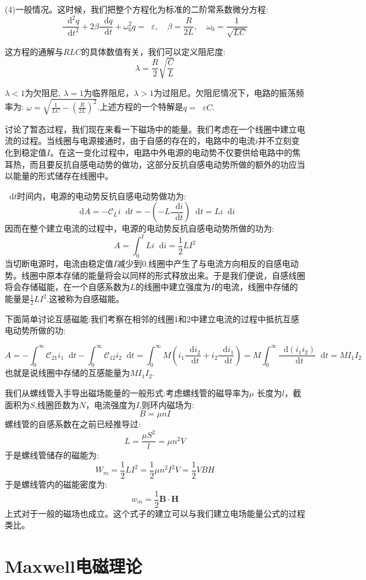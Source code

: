 \documentclass[12pt,a4paper,oneside]{report}
\theoremstyle{definition}
\theoremstyle{remark}
\renewcommand{\d}{\mathop{}\!\mathrm{d}}
\renewcommand{\v}{\mathop{}\!\varepsilon}
\begin{document}
(4)一般情况。这时候，我们把整个方程化为标准的二阶常系数微分方程:
\[
\frac{\d^2 q}{\d t^2}+2\beta \frac{\d q}{\d t}+\omega_0^2 q = \v,\quad \beta = \frac{R}{2L}, \quad \omega_0 = \frac{1}{\sqrt{LC}}
\]

这方程的通解与$RLC$的具体数值有关，我们可以定义阻尼度:
\[
\lambda = \frac{R}{2}\sqrt{\frac{C}{L}}
\]

$\lambda<1$为欠阻尼, $\lambda=1$为临界阻尼，$\lambda>1$为过阻尼。欠阻尼情况下，电路的振荡频率为:
$\omega = \sqrt{\frac{1}{LC}-(\frac{R}{2L})^2}$.上述方程的一个特解是$q=\v C$.

讨论了暂态过程，我们现在来看一下磁场中的能量。我们考虑在一个线圈中建立电流的过程。当线圈与电源接通时，由于自感的存在的，电路中的电流$i$并不立刻变化到稳定值$I$。在这一变化过程中，电路中外电源的电动势不仅要供给电路中的焦耳热，而且要反抗自感电动势的做功，这部分反抗自感电动势所做的额外的功应当以能量的形式储存在线圈中。

$\d t$时间内，电源的电动势反抗自感电动势做功为:
\[
\d A = -\mathscr C_{L} i \d t =-(-L\frac{\d i}{\d t})\d t = Li\d i
\]
因而在整个建立电流的过程中，电源的电动势反抗自感电动势所做的功为:
\[
A = \int_0^I Li\d i =\frac{1}{2}LI^2
\]
当切断电源时，电流由稳定值$I$减少到$0$.线圈中产生了与电流方向相反的自感电动势。线圈中原本存储的能量将会以同样的形式释放出来。于是我们便说，自感线圈将会存储磁能，在一个自感系数为$L$的线圈中建立强度为$I$的电流，线圈中存储的能量是$\frac{1}{2}LI^2$.这被称为自感磁能。

下面简单讨论互感磁能:我们考察在相邻的线圈$1$和$2$中建立电流的过程中抵抗互感电动势所做的功:

\[
A = -\int_0^{\infty}\mathscr C_{21}i_1\d t-\int_0^{\infty}\mathscr C_{12}i_2\d t =\int_0^{\infty} M(i_1\frac{\d i_2}{\d t}+i_2\frac{\d i_1}{\d t})=M\int_0^{\infty}\frac{\d(i_1i_2)}{\d t} \d t = MI_1I_2
\]
也就是说线圈中存储的互感能量为$MI_1I_2$.

我们从螺线管入手导出磁场能量的一般形式:考虑螺线管的磁导率为$\mu$ 长度为$l$，截面积为$S$,线圈匝数为$N$，电流强度为$I$,则环内磁场为:
\[
B  =\mu nI
\]
螺线管的自感系数在之前已经推导过:
\[
L = \frac{\mu S^2}{l} = \mu n^2 V
\]
于是螺线管储存的磁能为:
\[
W_m = \frac{1}{2}LI^2 = \frac{1}{2}\mu n^2 I^2 V = \frac{1}{2}VBH
\]
于是螺线管内的磁能密度为:
\[
w_m = \frac{1}{2}\mathbf{B}\cdot \mathbf{H}
\]
上式对于一般的磁场也成立。这个式子的建立可以与我们建立电场能量公式的过程类比。

\chapter{Maxwell电磁理论}
\end{document}

